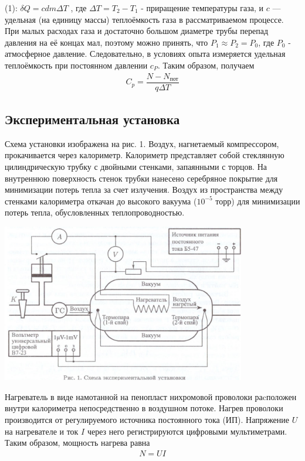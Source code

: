 \documentclass[a4paper, 12pt]{article}%
\begin{document}
(1): $\delta Q =c dm \Delta T$ , где $\Delta T = T_2 - T_1$ - приращение температуры газа, и $c$ — удельная (на единицу массы) теплоёмкость газа в рассматриваемом процессе. При малых расходах газа и достаточно большом диаметре трубы перепад давления на её концах мал, поэтому можно принять, что $P_1 \approx P_2 = P_0$, где $P_0$ - атмосферное давление. Следовательно, в условиях опыта измеряется удельная теплоёмкость при постоянном давлении $c_P$. Таким образом, получаем
\begin{equation}
\begin{aligned}
C_p = \dfrac{N - N_{\text{пот}}}{q \Delta T} 
\end{aligned}
\end{equation}
\subsection*{Экспериментальная установка}
Схема установки изображена на рис. 1. Воздух, нагнетаемый компрессором, прокачивается через калориметр. Калориметр представляет собой стеклянную цилиндрическую трубку с двойными стенками, запаянными с торцов. На внутреннюю поверхность стенок трубки нанесено серебряное покрытие для минимизации потерь тепла за счет излучения. Воздух из пространства между стенками калориметра откачан до высокого вакуума ($10^{-5}$ торр) для минимизации потерь тепла, обусловленных теплопроводностью.
\begin{center}
\includegraphics[width = 0.8\textwidth]{211_1.jpg}
\end{center}
Нагреватель в виде намотанной на пенопласт нихромовой проволоки раcположен внутри калориметра непосредственно в воздушном потоке. Нагрев проволоки производится от регулируемого источника постоянного тока (ИП). Напряжение $U$ на нагревателе и ток $I$ через него регистрируются цифровыми мультиметрами. Таким образом, мощность нагрева равна
\begin{equation}
\begin{aligned}
N = UI 
\end{aligned}
\end{equation}
\end{document}
